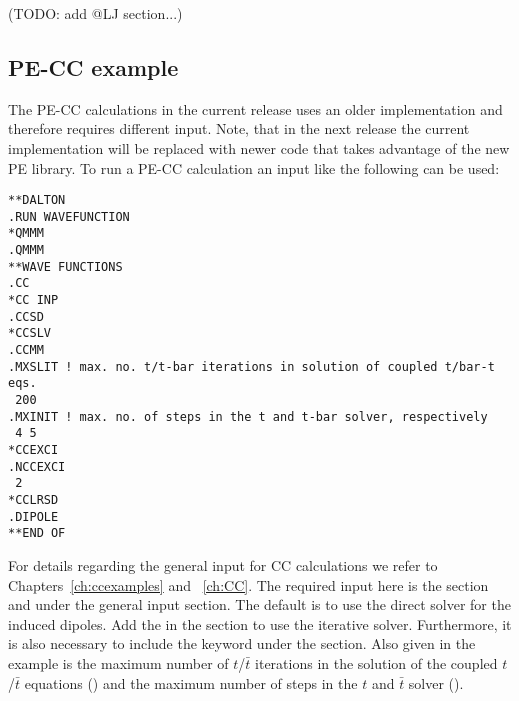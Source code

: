 \noindent (TODO: add @LJ section...)

\subsection*{PE-CC example}\label{sec:pecc}
The PE-CC calculations in the current release uses an older implementation and
therefore requires different input. Note, that in the next release the current
implementation will be replaced with newer code that takes advantage of the
new PE library. To run a PE-CC calculation an input like the following can be
used:
\begin{verbatim}
**DALTON
.RUN WAVEFUNCTION
*QMMM
.QMMM
**WAVE FUNCTIONS
.CC
*CC INP
.CCSD
*CCSLV
.CCMM
.MXSLIT ! max. no. t/t-bar iterations in solution of coupled t/bar-t eqs.
 200
.MXINIT ! max. no. of steps in the t and t-bar solver, respectively
 4 5
*CCEXCI
.NCCEXCI
 2
*CCLRSD
.DIPOLE
**END OF
\end{verbatim}
For details regarding the general input for CC calculations we refer to
Chapters~\ref{ch:ccexamples} and ~\ref{ch:CC}. The required input here is the
 section and  under the general  input
section. The default is to use the direct solver for the induced dipoles. Add
the  in the  section to use the iterative solver.
Furthermore, it is also necessary to include the  keyword under the
 section. Also given in the example is the maximum number of
$t$/$\bar{t}$ iterations in the solution of the coupled $t$/$\bar{t}$
equations () and the maximum number of steps in the $t$ and
$\bar{t}$ solver ().

